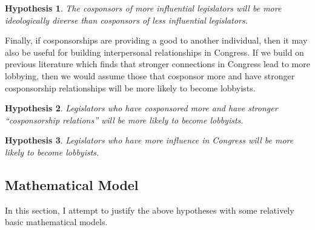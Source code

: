 \documentclass{article}
\newtheorem{hypothesis}{Hypothesis}
\begin{document}
\begin{hypothesis}
    \label{hyp:cosponsor_ideology}
    The cosponsors of more influential legislators will be more ideologically diverse than cosponsors of less influential legislators. 
\end{hypothesis}

Finally, if cosponsorships are providing a good to another individual, then it may also be useful for building interpersonal relationships in Congress. If we build on previous literature \cite{lazarus_mckay_herbel2016} \cite{vidal2012} which finds that stronger connections in Congress lead to more lobbying, then we would assume those that cosponsor more and have stronger cosponsorship relationships will be more likely to become lobbyists.

\begin{hypothesis}
    \label{hyp:lobbying_relations}
    Legislators who have cosponsored more and have stronger ``cosponsorship relations'' will be more likely to become lobbyists.
\end{hypothesis}
\begin{hypothesis}
    \label{hyp:lobbying_prestige}
    Legislators who have more influence in Congress will be more likely to become lobbyists. 
\end{hypothesis}

\subsection{Mathematical Model}
In this section, I attempt to justify the above hypotheses with some relatively basic mathematical models. 
\end{document}
